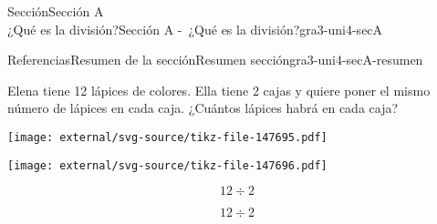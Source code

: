 \begin{sectionptx}{Sección}{{\Large Sección A\\}¿Qué es la división?}{}{Sección A -~¿Qué es la división?}{}{}{gra3-uni4-secA}
\begin{references-subsection}{Referencias}{Resumen de la sección}{}{Resumen sección}{}{}{gra3-uni4-secA-resumen}
\begin{sidebyside}{2}{0.025}{0.025}{0.05}
\begin{sbspanel}{0.45}
\end{sbspanel}%
\begin{sbspanel}{0.45}%
\par
Elena tiene 12 lápices de colores. Ella tiene 2 cajas y quiere poner el mismo número de lápices en cada caja. ¿Cuántos lápices habrá en cada caja?%
\end{sbspanel}%
\end{sidebyside}%
\begin{sidebyside}{2}{0.025}{0.025}{0.05}%
\begin{sbspanel}{0.45}%
\texttt{[image: external/svg-source/tikz-file-147695.pdf]}
\end{sbspanel}%
\begin{sbspanel}{0.45}%
\texttt{[image: external/svg-source/tikz-file-147696.pdf]}
\end{sbspanel}%
\end{sidebyside}%
\begin{sidebyside}{2}{0.025}{0.025}{0.05}%
\begin{sbspanel}{0.45}%
%
\begin{equation*}
12 \div 2
\end{equation*}
%
\end{sbspanel}%
\begin{sbspanel}{0.45}%
\par
%
\begin{equation*}
12 \div 2
\end{equation*}
%
\end{sbspanel}%
\end{sidebyside}%
\end{references-subsection}
\end{sectionptx}
%
%
\typeout{************************************************}
\typeout{************************************************}
%
